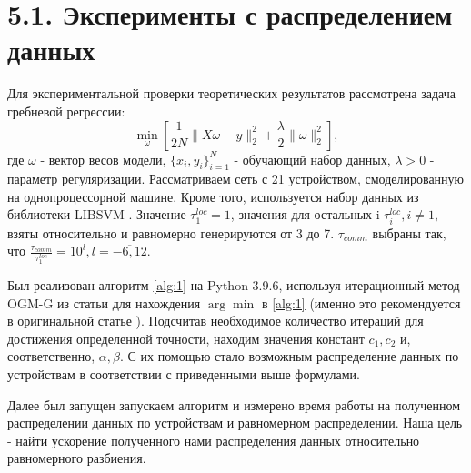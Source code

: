 \documentclass{article}
\theoremstyle{definition}
\theoremstyle{plain}
\begin{document}
\section*{5.1. Эксперименты с распределением данных}
Для экспериментальной проверки теоретических результатов рассмотрена задача гребневой регрессии: 
\begin{equation}
    \label{ridge}
    \underset{\omega}{\min}[ \frac{1}{2N} \|X\omega - y\|_2^2 + \frac{\lambda}{2}\|\omega\|_2^2],
\end{equation}
где $\omega$ - вектор весов модели, $\{x_i, y_i\}_{i = 1}^N$ - обучающий набор данных, $\lambda > 0$ - параметр регуляризации. Рассматриваем сеть с 21 устройством, смоделированную на однопроцессорной машине. Кроме того, используется набор данных из библиотеки LIBSVM \cite{chang2011libsvm}. Значение $\tau_1^{loc} = 1$, значения для остальных i $\tau_i^{loc}, i \neq 1$, взяты относительно и равномерно генерируются от 3 до 7. $\tau_{comm}$ выбраны так, что $\frac{\tau _{comm}}{\tau _1^{loc}} = 10^l, l = \overline{-6, 12}$.

Был реализован алгоритм \ref{alg:1} на Python 3.9.6, используя итерационный метод OGM-G из статьи \cite{kim2021optimizing} для нахождения $\arg\min$ в \ref{alg:1} (именно это рекомендуется в оригинальной статье \cite{kovalev2022optimal}). Подсчитав необходимое количество итераций для достижения определенной точности, находим значения констант $c_1, c_2$ и, соответственно, $\alpha, \beta$. С их помощью стало возможным распределение данных по устройствам в соответствии с приведенными выше формулами. 

Далее был запущен запускаем алгоритм и измерено время работы на полученном распределении данных по устройствам и равномерном распределении. Наша цель - найти ускорение полученного нами распределения данных относительно равномерного разбиения. 
\end{document}
